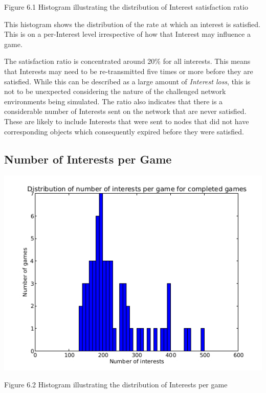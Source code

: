 \documentclass[a4paper,12pt]{report}      %
\begin{document}
\begin{center}Figure 6.1 Histogram illustrating the distribution of Interest satisfaction ratio\end{center}

This histogram shows the distribution of the rate at which an interest is satisfied. This is on a per-Interest 
level irrespective of how that Interest may influence a game. 

The satisfaction ratio is concentrated around 20\% for all interests. This means that Interests may 
need to be re-transmitted five times or more before they are satisfied. While this can be described as a large 
amount of \emph{Interest loss}, this is not to be unexpected considering the nature of the challenged network
 environments being simulated. The ratio also indicates that there is a considerable number of Interests sent
on the network that are never satisfied. These are likely to include Interests that were sent to nodes that 
did not have corresponding objects which consequently expired before they were satisfied. 


\subsection{Number of Interests per Game}

\includegraphics[scale=0.73]{InterestsPerGameHist.jpg}

\begin{center}Figure 6.2 Histogram illustrating the distribution of Interests per game\end{center}
\end{document}
